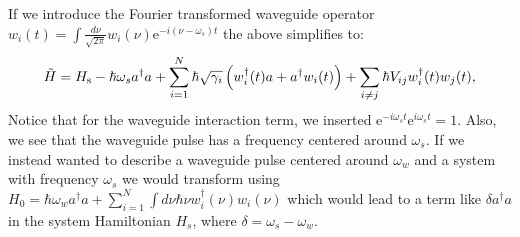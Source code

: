 If we introduce the Fourier transformed waveguide operator $w_i(t) =\int \frac{d \nu}{\sqrt{2 \pi}} w_{i}(\nu) \mathrm{e}^{-i(\nu - \omega_s) t}$ the above simplifies to:
\begin{align}
\Tilde{H} = H_{\mathrm{s}}-\hbar \omega_s a^\dagger a+\sum_{i=1}^N \hbar \sqrt{\gamma_i} \left(w_{i}^{\dagger}(t) a+a^{\dagger} w_{i}(t)\right) + \sum_{i \neq j} \hbar V_{i j} w_{i}^{\dagger}(t) w_{j}(t), \label{eq:general_h}
\end{align}
Notice that for the waveguide interaction term, we inserted $\mathrm{e}^{-i \omega_s t}\mathrm{e}^{i \omega_s t} = 1$. Also, we see that the waveguide pulse has a frequency centered around $\omega_s$. If we instead wanted to describe a waveguide pulse centered around $\omega_w$ and a system with frequency $\omega_s$ we would transform using $H_0 =\hbar \omega_w a^\dagger a + \sum_{i=1}^N \int d \nu \hbar \nu w_{i}^{\dagger}(\nu) w_{i}(\nu)$ which would lead to a term like $\delta a^\dagger a$ in the system Hamiltonian $H_s$, where $\delta = \omega_s - \omega_w$.

